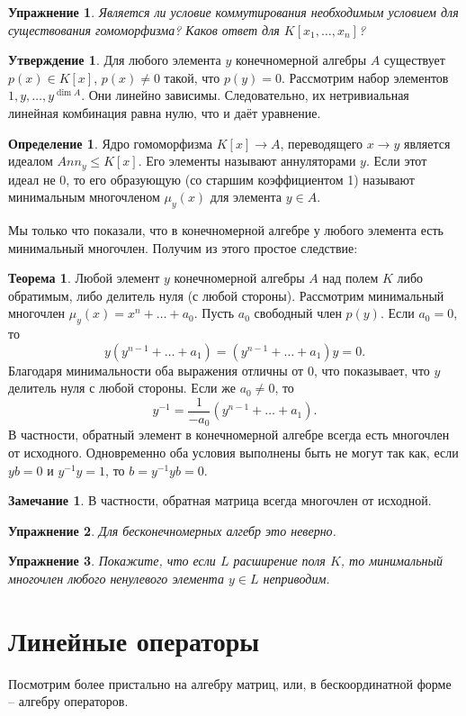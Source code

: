 \documentclass[10pt,a4paper,oneside]{book}
\newtheorem{uprz}{\color{violet!100!black} Упражнение}
\theoremstyle{definition}
\newtheorem*{rem}{\color{green!50!blue}Замечание}
\newtheorem*{defn}{\color{yellow!30!red} Определение}
\newtheorem{thm}{\color{red!40!black}Теорема}
\newtheorem{utvr}{\color{blue!50!black}Утверждение}
\renewcommand{\leq}{\leqslant}
\def\thrm{\begin{thm}}
\def\ethrm{\end{thm}}
\def\dfn{\begin{defn}}
\def\edfn{\end{defn}}
\def\rm{\begin{rem}}
\def\erm{\end{rem}}
\def\utv{\begin{utvr}}
\def\eutv{\end{utvr}}
\def\upr{\begin{uprz}}
\def\eupr{\end{uprz}}
\begin{document}
\upr Является ли условие коммутирования необходимым условием для существования гомоморфизма? Каков ответ для $K[x_1,\dots,x_n]$?
\eupr




\utv Для любого элемента $y$ конечномерной алгебры $A$ существует $p(x)\in K[x]$, $p(x)\neq 0$ такой, что $p(y)=0$.
\proof Рассмотрим набор элементов $1,y,\dots, y^{\dim A}$. Они линейно зависимы. Следовательно, их нетривиальная линейная комбинация равна нулю, что и даёт уравнение.
\endproof
\eutv


\dfn Ядро гомоморфизма $K[x] \to A$, переводящего $x \to y$ является идеалом  $Ann_y\leq K[x]$. Его элементы называют аннуляторами $y$. Если этот идеал не 0, то его образующую (со старшим коэффициентом 1) называют минимальным многочленом $\mu_y(x)$ для элемента $y\in A$.
\edfn

Мы только что показали, что в конечномерной алгебре у любого элемента есть минимальный многочлен. Получим из этого простое следствие:

\thrm Любой элемент $y$ конечномерной алгебры $A$ над полем $K$ либо обратимым, либо делитель нуля (с любой стороны).
\proof Рассмотрим минимальный многочлен $\mu_y(x)= x^n+ \dots+a_0$. Пусть $a_0$ свободный член $p(y)$. Если $a_0=0$, то $$y(y^{n-1}+
\dots + a_1)=(y^{n-1}+
\dots + a_1)y=0.$$ Благодаря минимальности оба выражения отличны от 0, что показывает, что $y$ делитель нуля с любой стороны. Если же $a_0\neq 0$, то $$y^{-1}=\frac{1}{-a_0}(y^{n-1}+
\dots + a_1).$$ В частности, обратный элемент в конечномерной алгебре всегда есть многочлен от исходного. Одновременно оба условия выполнены быть не могут так как, если $yb=0$ и $y^{-1}y=1$, то $b=y^{-1}yb=0$.
\endproof
\ethrm

\rm В частности, обратная матрица всегда многочлен от исходной.
\erm

\upr Для бесконечномерных алгебр это неверно.
\eupr

\upr Покажите, что если $L$ расширение поля $K$, то минимальный многочлен любого ненулевого элемента $y\in L$ неприводим.
\eupr





\section{Линейные операторы}

Посмотрим более пристально на алгебру матриц, или, в бескоординатной форме -- алгебру операторов.
\end{document}
